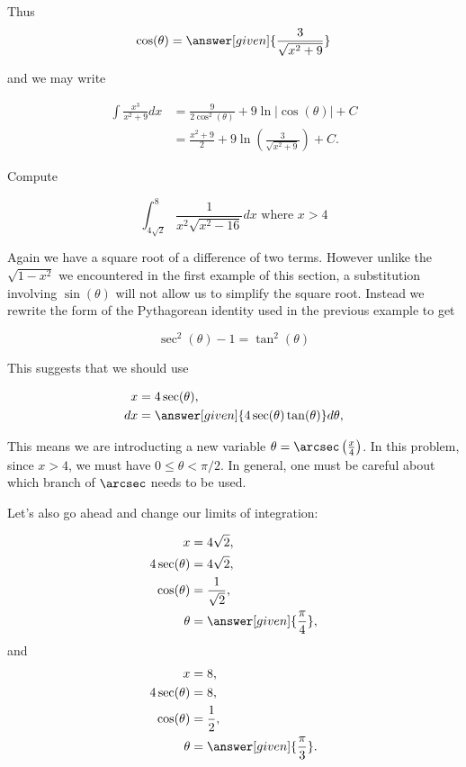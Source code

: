 \documentclass{ximera}
\begin{document}
\begin{example}
\begin{explanation}
    Thus
    \[
    \cos(\theta) =  \answer[given]{\frac{3}{\sqrt{x^{2}+9}}}
    \]

    and we may write

    \begin{align*}
      \int \frac{x^3}{x^2+9} dx &= \frac{9}{2\cos^2(\theta)} + 9\ln|\cos(\theta)| + C\\
      &= \frac{x^{2}+9}{2} + 9 \ln\left(\frac{3}{\sqrt{x^{2}+9}}\right) + C.
    \end{align*}


  \end{explanation}
\end{example}


\begin{example}
Compute 

\[
\int_{4\sqrt{2}}^{8} \frac{1}{ x^{2}\sqrt{x^{2}-16}} dx \text{ where } x > 4
\]

\begin{explanation}
Again we have a square root of a difference of two terms. However unlike the $\sqrt{1-x^{2}}$ we encountered 
in the first example of this section, a substitution involving $\sin(\theta)$ will not allow us to simplify 
the square root. Instead we rewrite the form of the Pythagorean identity used in the previous example to get 

\[
\sec^{2}(\theta)-1=\tan^{2}(\theta)
\]

This suggests that we should use 

 \begin{align*}
      x &= 4\sec(\theta),\\
      dx &= \answer[given]{4\sec(\theta)\tan(\theta)} d\theta,
    \end{align*}

\begin{remark}
This means we are introducting a new variable $\theta=\arcsec\left(\frac{x}{4}\right)$. 
In this problem, since $x > 4$, we must have $0 \leq \theta < \pi/2 $.  In general, one must be careful about which branch of $\arcsec$ needs to be used. 
\end{remark}
Let's also go ahead and change our limits of integration:


    \begin{align*}
      x &= 4\sqrt{2},\\
     4 \sec(\theta) &=4\sqrt{2},\\
       \cos(\theta)&=\frac{1}{\sqrt{2}}, \\
      \theta &= \answer[given]{\frac{\pi}{4}},
    \end{align*}
    and
    \begin{align*}
      x &= 8,\\
     4 \sec(\theta) &= 8,\\
        \cos(\theta)&=\frac{1}{2}, \\
      \theta &= \answer[given]{\frac{\pi}{3}}.
    \end{align*}



\end{explanation}
\end{example}
\end{document}
